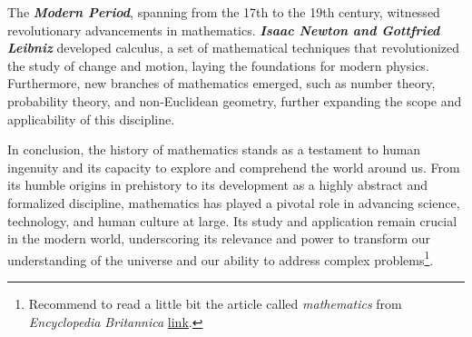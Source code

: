 The \textbf{\textit{Modern Period}}, spanning from the 17th to the 19th century, witnessed revolutionary advancements in mathematics. \textbf{\textit{Isaac Newton and Gottfried Leibniz}} developed calculus, a set of mathematical techniques that revolutionized the study of change and motion, laying the foundations for modern physics. Furthermore, new branches of mathematics emerged, such as number theory, probability theory, and non-Euclidean geometry, further expanding the scope and applicability of this discipline.

In conclusion, the history of mathematics stands as a testament to human ingenuity and its capacity to explore and comprehend the world around us. From its humble origins in prehistory to its development as a highly abstract and formalized discipline, mathematics has played a pivotal role in advancing science, technology, and human culture at large. Its study and application remain crucial in the modern world, underscoring its relevance and power to transform our understanding of the universe and our ability to address complex problems\footnote{
  Recommend to read a little bit the article called \textit{mathematics} from \textit{Encyclopedia Britannica}
  \href{https://www.britannica.com/science/mathematics}{link}.
}.



















